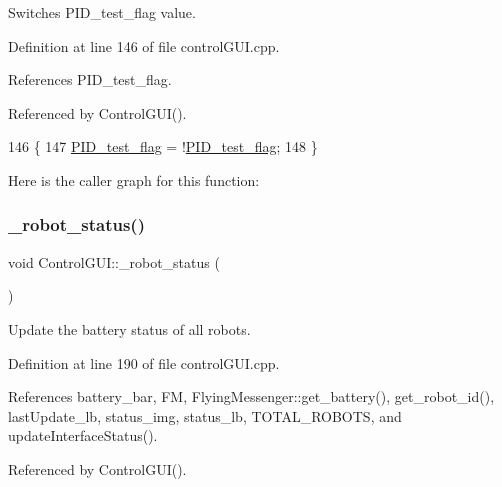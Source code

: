 Switches P\+I\+D\+\_\+test\+\_\+flag value. 



Definition at line 146 of file control\+G\+U\+I.\+cpp.



References P\+I\+D\+\_\+test\+\_\+flag.



Referenced by Control\+G\+U\+I().


\begin{DoxyCode}
146                            \{
147     \hyperlink{class_control_g_u_i_a7839defbdc6354cabaa58ceadfe926c3}{PID\_test\_flag} = !\hyperlink{class_control_g_u_i_a7839defbdc6354cabaa58ceadfe926c3}{PID\_test\_flag};
148 \}
\end{DoxyCode}
Here is the caller graph for this function\+:
\mbox{\label{class_control_g_u_i_abe917aff974bd6ac9ce5193edc864814}} 
\subsubsection{\texorpdfstring{\+\_\+robot\+\_\+status()}{\_robot\_status()}}
{\footnotesize\ttfamily void Control\+G\+U\+I\+::\+\_\+robot\+\_\+status (\begin{DoxyParamCaption}{ }\end{DoxyParamCaption})}



Update the battery status of all robots. 



Definition at line 190 of file control\+G\+U\+I.\+cpp.



References battery\+\_\+bar, FM, Flying\+Messenger\+::get\+\_\+battery(), get\+\_\+robot\+\_\+id(), last\+Update\+\_\+lb, status\+\_\+img, status\+\_\+lb, T\+O\+T\+A\+L\+\_\+\+R\+O\+B\+O\+TS, and update\+Interface\+Status().



Referenced by Control\+G\+U\+I().


